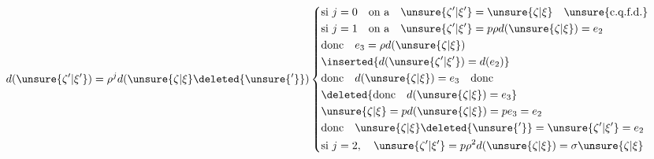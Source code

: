 \[
d(\unsure{\zeta'|\xi'})=\rho^j d(\unsure{\zeta|\xi}\deleted{\unsure{'}})
\left\{\begin{aligned}
&\text{si }j=0\quad\text{on a}\quad\unsure{\zeta'|\xi'}=\unsure{\zeta|\xi}\quad\unsure{\text{c.q.f.d.}}\\
&\text{si }j=1\quad\text{on a}\quad\unsure{\zeta'|\xi'}=p\rho d(\unsure{\zeta|\xi})=e_2\\
&\text{donc}\quad e_3=\rho d(\unsure{\zeta|\xi})\\
&\inserted{d(\unsure{\zeta'|\xi'})=d(e_2)}\\
&\text{donc}\quad d(\unsure{\zeta|\xi})=e_3\quad\text{donc}\\
&\deleted{\text{donc}\quad d(\unsure{\zeta|\xi})=e_3}\\
&\unsure{\zeta|\xi}=pd(\unsure{\zeta|\xi})=pe_3=e_2\\
&\text{donc}\quad\unsure{\zeta|\xi}\deleted{\unsure{'}}=\unsure{\zeta'|\xi'}=e_2\\
&\text{si }j=2,\quad\unsure{\zeta'|\xi'}=p\rho^2d(\unsure{\zeta|\xi})=\sigma\unsure{\zeta|\xi}
\end{aligned}\right.
\]

